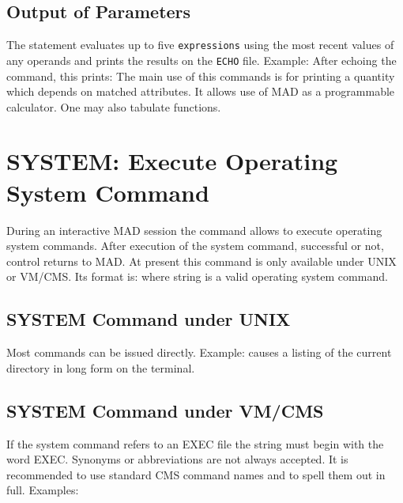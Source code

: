 \subsection{Output of Parameters}
\label{S-VALUE}
The  statement
evaluates up to five {\tt expressions} using the most recent values of
any operands and prints the results on the {\tt ECHO} file.
Example:
After echoing the command, this prints:
The main use of this commands is for printing a quantity
which depends on matched attributes.
It allows use of MAD as a programmable calculator.
One may also tabulate functions.
 
\section{SYSTEM: Execute Operating System Command}
\label{S-SYSTEM}
During an interactive MAD session the command 
allows to execute operating system commands.
After execution of the system command, successful or not,
control returns to MAD.
At present this command is only available under UNIX or VM/CMS.
Its format is:
where string is a valid operating system command.
 
\subsection{SYSTEM Command under UNIX}
Most  commands can be issued directly. Example:
causes a listing of the current directory in long form on the terminal.
 
\subsection{SYSTEM Command under VM/CMS}
If the  system command refers to an EXEC file the string
must begin with the word EXEC.
Synonyms or abbreviations are not always accepted.
It is recommended to use standard CMS command names
and to spell them out in full.
Examples:
 
